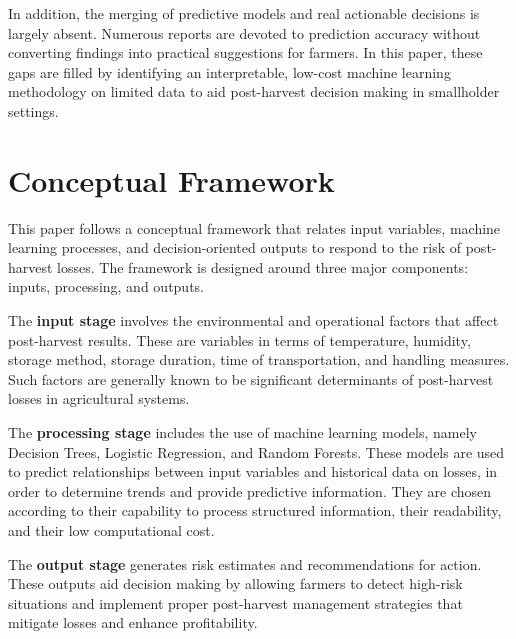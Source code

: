 In addition, the merging of predictive models and real actionable decisions is largely absent.
Numerous reports are devoted to prediction accuracy without converting findings into practical
suggestions for farmers. In this paper, these gaps are filled by identifying an interpretable,
low-cost machine learning methodology on limited data to aid post-harvest decision making in
smallholder settings.


\section{Conceptual Framework}

This paper follows a conceptual framework that relates input variables, machine learning processes,
and decision-oriented outputs to respond to the risk of post-harvest losses. The framework is
designed around three major components: inputs, processing, and outputs.

The \textbf{input stage} involves the environmental and operational factors that affect post-harvest
results. These are variables in terms of temperature, humidity, storage method, storage duration,
time of transportation, and handling measures. Such factors are generally known to be significant
determinants of post-harvest losses in agricultural systems.

The \textbf{processing stage} includes the use of machine learning models, namely Decision Trees,
Logistic Regression, and Random Forests. These models are used to predict relationships between
input variables and historical data on losses, in order to determine trends and provide predictive
information. They are chosen according to their capability to process structured information, their
readability, and their low computational cost.

The \textbf{output stage} generates risk estimates and recommendations for action. These outputs
aid decision making by allowing farmers to detect high-risk situations and implement proper
post-harvest management strategies that mitigate losses and enhance profitability.
